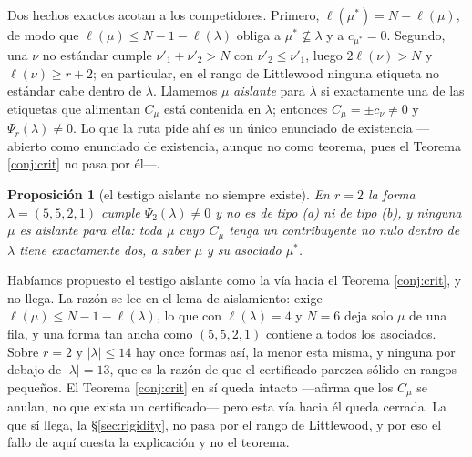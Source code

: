 \documentclass[11pt,reqno]{amsart}
\theoremstyle{plain}
\newtheorem{proposition}[theorem]{Proposición}
\theoremstyle{definition}
\begin{document}
Dos hechos exactos acotan a los competidores. Primero, $\ell(\mu^{*})=N-\ell(\mu)$, de modo que
$\ell(\mu)\le N-1-\ell(\lambda)$ obliga a $\mu^{*}\not\subseteq\lambda$ y a $c_{\mu^{*}}=0$. Segundo,
una $\nu$ no estándar cumple $\nu'_1+\nu'_2>N$ con $\nu'_2\le\nu'_1$, luego $2\ell(\nu)>N$ y
$\ell(\nu)\ge r+2$; en particular, en el rango de Littlewood ninguna etiqueta no estándar cabe dentro
de $\lambda$. Llamemos $\mu$ \emph{aislante} para $\lambda$ si exactamente una de las etiquetas que
alimentan $C_\mu$ está contenida en $\lambda$; entonces $C_\mu=\pm c_\nu\ne0$ y
$\Psi_r(\lambda)\ne0$. Lo que la ruta pide ahí es un único enunciado de existencia ---abierto como
enunciado de existencia, aunque no como teorema, pues el Teorema \ref{conj:crit} no pasa por él---.

\begin{proposition}[el testigo aislante no siempre existe]\label{conj:iso}
En $r=2$ la forma $\lambda=(5,5,2,1)$ cumple $\Psi_2(\lambda)\ne0$ y no es de tipo {\rm(a)} ni de
tipo {\rm(b)}, y ninguna $\mu$ es aislante para ella: toda $\mu$ cuyo $C_\mu$ tenga un contribuyente
no nulo dentro de $\lambda$ tiene exactamente dos, a saber $\mu$ y su asociado $\mu^{*}$.
\end{proposition}

Habíamos propuesto el testigo aislante como la vía hacia el Teorema \ref{conj:crit}, y no llega. La
razón se lee en el lema de aislamiento: exige $\ell(\mu)\le N-1-\ell(\lambda)$, lo que con
$\ell(\lambda)=4$ y $N=6$ deja solo $\mu$ de una fila, y una forma tan ancha como $(5,5,2,1)$
contiene a todos los asociados. Sobre $r=2$ y $|\lambda|\le14$ hay once formas así, la menor esta
misma, y ninguna por debajo de $|\lambda|=13$, que es la razón de que el certificado parezca sólido
en rangos pequeños. El Teorema \ref{conj:crit} en sí queda intacto ---afirma que los $C_\mu$ se
anulan, no que exista un certificado--- pero esta vía hacia él queda cerrada. La que sí llega, la
\S\ref{sec:rigidity}, no pasa por el rango de Littlewood, y por eso el fallo de aquí cuesta la
explicación y no el teorema.
\end{document}

